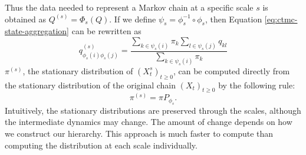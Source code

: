%
Thus the data needed to represent a Markov chain at a specific scale $s$ is obtained as $Q^{(s)} = \Phi_s(Q)$.
If we define $\psi_s = \phi_s^{-1} \circ \phi_s$, then Equation \ref{eq:ctmc-state-aggregation} can be rewritten as
\begin{equation}
	\label{eq:ctmc-aggregation-alternative}
	q_{\phi_s(i)\phi_s(j)}^{(s)} = \frac{\sum_{k \in \psi_s(i)}\pi_k \sum_{l \in \psi_s(j)} q_{kl}}{\sum_{k \in \psi_s(i)}\pi_k}
\end{equation}
$\pi^{(s)}$, the stationary distribution of $(X_t^{s})_{t \ge 0}$, can be computed directly from
the stationary distribution of the original chain $(X_t)_{t \ge 0}$ by the following rule:
\begin{equation}
	\nonumber
	\pi^{(s)} = \pi P_{\phi_s}.
\end{equation}
Intuitively, the stationary distributions are preserved through the scales, although the intermediate dynamics may change. The amount of change depends on how we construct our hierarchy. This approach is much faster to compute than computing the distribution at each scale individually.

